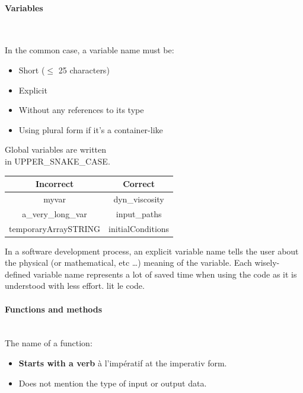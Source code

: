 \documentclass[11pt]{article}
\begin{document}
				\paragraph{Variables} \mbox{}\\

					\begin{minipage}{0.45\textwidth}
							In the common case, a variable name must be:
							\begin{itemize}
								\setlength\itemsep{0pt}
								\item Short ($\leq$ 25 characters)
								\item Explicit
								\item Without any references to its type
								\item Using plural form if it's a container-like

							\end{itemize}
							Global variables are written \\ in
							UPPER\_SNAKE\_CASE.
							\\


					\end{minipage}
					\begin{minipage}{0.55\textwidth}
							\begin{tabular}{cc}
								\hline
								Incorrect    & Correct           \\
								\hline
								myvar                & dyn\_viscosity    \\
								a\_very\_long\_var   & input\_paths      \\
								temporaryArraySTRING & initialConditions

							\end{tabular}
					\end{minipage}
					In a software development process, an explicit variable name tells the user about the physical (or mathematical, etc \ldots) meaning
                    of the variable. Each wisely-defined variable name represents a lot of saved time when using the code as it is understood with less effort.
					lit le code.

				\paragraph{Functions and methods}  \mbox{}\\
					The name of a function:
					\begin{itemize}
							\item \textbf{Starts with a verb} à l'impératif at the imperativ form.
							\item Does not mention the type of input or output data.
					\end{itemize}
\end{document}
